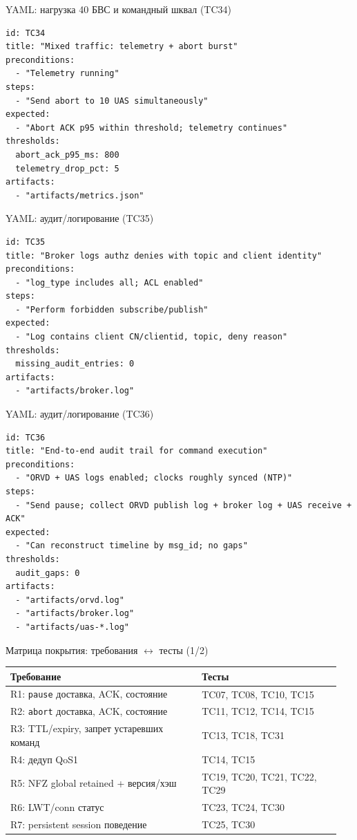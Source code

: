 \documentclass[aspectratio=169]{beamer}
\begin{document}
\begin{frame}[fragile]{YAML: нагрузка 40 БВС и командный шквал (TC34)}
\begin{Verbatim}[fontsize=\scriptsize, baselinestretch=0.85]
id: TC34
title: "Mixed traffic: telemetry + abort burst"
preconditions:
  - "Telemetry running"
steps:
  - "Send abort to 10 UAS simultaneously"
expected:
  - "Abort ACK p95 within threshold; telemetry continues"
thresholds:
  abort_ack_p95_ms: 800
  telemetry_drop_pct: 5
artifacts:
  - "artifacts/metrics.json"
\end{Verbatim}
\end{frame}

\begin{frame}[fragile]{YAML: аудит/логирование (TC35)}
\begin{Verbatim}[fontsize=\scriptsize, baselinestretch=0.85]
id: TC35
title: "Broker logs authz denies with topic and client identity"
preconditions:
  - "log_type includes all; ACL enabled"
steps:
  - "Perform forbidden subscribe/publish"
expected:
  - "Log contains client CN/clientid, topic, deny reason"
thresholds:
  missing_audit_entries: 0
artifacts:
  - "artifacts/broker.log"
\end{Verbatim}
\end{frame}

\begin{frame}[fragile]{YAML: аудит/логирование (TC36)}
\begin{Verbatim}[fontsize=\scriptsize, baselinestretch=0.85]
id: TC36
title: "End-to-end audit trail for command execution"
preconditions:
  - "ORVD + UAS logs enabled; clocks roughly synced (NTP)"
steps:
  - "Send pause; collect ORVD publish log + broker log + UAS receive + ACK"
expected:
  - "Can reconstruct timeline by msg_id; no gaps"
thresholds:
  audit_gaps: 0
artifacts:
  - "artifacts/orvd.log"
  - "artifacts/broker.log"
  - "artifacts/uas-*.log"
\end{Verbatim}
\end{frame}

\begin{frame}[fragile]{Матрица покрытия: требования $\leftrightarrow$ тесты (1/2)}
\small
\begin{tabular}{@{}p{0.55\linewidth}p{0.40\linewidth}@{}}
\toprule
Требование & Тесты \\
\midrule
R1: \texttt{pause} доставка, ACK, состояние & TC07, TC08, TC10, TC15 \\
R2: \texttt{abort} доставка, ACK, состояние & TC11, TC12, TC14, TC15 \\
R3: TTL/expiry, запрет устаревших команд & TC13, TC18, TC31 \\
R4: дедуп QoS1 & TC14, TC15 \\
R5: NFZ global retained + версия/хэш & TC19, TC20, TC21, TC22, TC29 \\
R6: LWT/conn статус & TC23, TC24, TC30 \\
R7: persistent session поведение & TC25, TC30 \\
\bottomrule
\end{tabular}
\end{frame}
\end{document}
